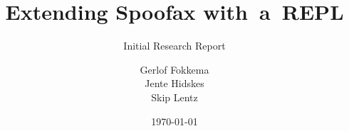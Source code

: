 \title[tudelft-black]{Extending Spoofax with~a~REPL}
\subtitle[tudelft-black]{Initial Research Report}
\author[tudelft-black]{%
Gerlof Fokkema\\
Jente Hidskes\\
Skip Lentz}
\date{\today}

